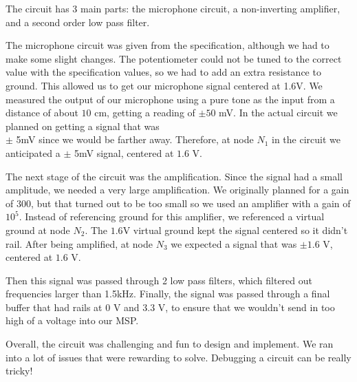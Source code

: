 \documentclass{article}
\begin{document}
The circuit has 3 main parts: the microphone circuit, a non-inverting amplifier,
and a second order low pass filter.

The microphone circuit was given from the specification, although we had to make
some slight changes. The potentiometer could not be tuned to the correct value with
the specification values, so we had to add an extra resistance to ground. This
allowed us to get our microphone signal centered at 1.6V. We measured the output of our microphone using a pure tone as the input from a distance of about $10$ cm, getting a reading of $\pm 50$ mV. In the actual circuit we planned on getting a signal
that was \\ $\pm$ 5mV since we would be farther away. Therefore, at node $N_1$ in the circuit we anticipated
a $\pm$ 5mV signal, centered at $1.6$ V.

The next stage of the circuit was the amplification. Since the signal had a small amplitude, we needed a very large amplification. We originally planned for a gain of $300$, but that turned out to be too small so we used an amplifier with a gain of $10^{5}$. Instead of referencing ground for this amplifier, we referenced a virtual ground at node $N_2$. The $1.6$V virtual ground kept the signal centered so it didn't rail.
After being amplified, at node $N_3$ we expected a signal that was $\pm 1.6$ V, centered at $1.6$ V.

Then this signal was passed through 2 low pass filters, which filtered out frequencies larger than 1.5kHz. Finally, the signal was passed through a final buffer that had rails at $0$ V and $3.3$ V, to ensure that we wouldn't send in too high of a voltage into our MSP.

Overall, the circuit was challenging and fun to design and implement. We ran into a lot of issues that were rewarding to solve. Debugging a circuit can be really tricky!
\end{document}
